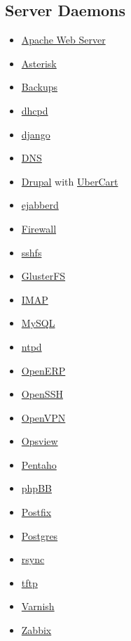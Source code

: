 \subsection{Server Daemons}
\begin{itemize}
\item \href{http://httpd.apache.org/}{Apache Web Server}
\item \href{http://www.asterisk.org}{Asterisk}
\item \href{https://github.com/tummy-dot-com/tummy-backup}{Backups}
\item \href{http://dnsmasq.org/}{dhcpd}
\item \href{https://www.djangoproject.com/}{django}
\item \href{http://dnsmasq.org/}{DNS}
\item \href{http://www.drupal.org}{Drupal} with \href{http://www.ubercart.org/}{UberCart}
\item \href{http://www.ejabberd.im/}{ejabberd}
\item \href{http://www.openbsd.org/faq/pf/}{Firewall}
\item \href{http://fuse.sourceforge.net/sshfs.html}{sshfs}
\item \href{http://www.gluster.org/}{GlusterFS}
\item \href{http://dovecot.org/}{IMAP}
\item \href{http://www.mysql.org/}{MySQL}
\item \href{http://support.ntp.org/}{ntpd}
\item \href{http://www.openerp.org/}{OpenERP}
\item \href{http://www.openssh.com/}{OpenSSH}
\item \href{http://openvpn.net/}{OpenVPN}
\item \href{http://www.opsview.com/}{Opsview}
\item \href{http://community.pentaho.com/}{Pentaho}
\item \href{https://www.phpbb.com/}{phpBB}
\item \href{http://www.postfix.org/}{Postfix}
\item \href{http://www.postgresql.org/}{Postgres}
\item \href{http://rsync.samba.org/}{rsync}
\item \href{http://dnsmasq.org/}{tftp}
\item \href{https://www.varnish-cache.org/}{Varnish}
\item \href{http://www.zabbix.com/}{Zabbix}
\end{itemize}

